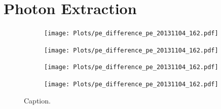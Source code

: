 \section{Photon Extraction}
%
\begin{figure}
  \begin{subfigure}{\textwidth}
    \centering
    \texttt{[image: Plots/pe\_difference\_pe\_20131104\_162.pdf]}
  \end{subfigure}
  \begin{subfigure}{\textwidth}
    \centering
    \texttt{[image: Plots/pe\_difference\_pe\_20131104\_162.pdf]}
  \end{subfigure}
  \begin{subfigure}{\textwidth}
    \centering
    \texttt{[image: Plots/pe\_difference\_pe\_20131104\_162.pdf]}
  \end{subfigure}
  \begin{subfigure}{\textwidth}
    \centering
    \texttt{[image: Plots/pe\_difference\_pe\_20131104\_162.pdf]}
  \end{subfigure}
  \caption{Caption.}
  \label{fig:difference}
\end{figure}

